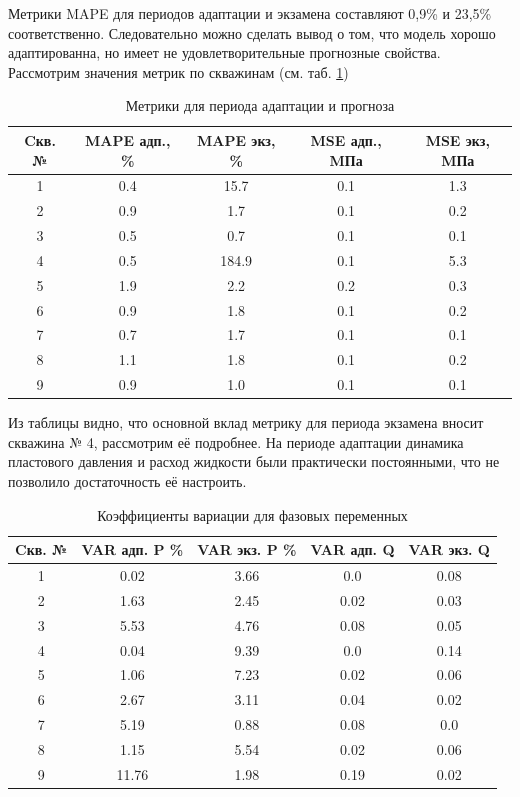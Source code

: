 \documentclass[14pt]{article}
\begin{document}
	 Метрики MAPE для периодов адаптации и экзамена составляют 0,9\% и 23,5\% соответственно. Следовательно можно сделать вывод о том, что модель хорошо адаптированна, но имеет не удовлетворительные прогнозные свойства. Рассмотрим значения метрик по скважинам (см. таб. \ref{tabl:well_mape}) 
	\begin{table}[h!]
		\caption{Метрики для периода адаптации и прогноза}	
		\label{tabl:well_mape}	
		\begin{center}
		\begin{tabular}{c|c|c|c|c}
		\hline
		Cкв. № & MAPE адп., \% & MAPE экз, \% & MSE адп., MПа & MSE экз, MПа \\
		\hline
 		1 & 0.4 & 15.7 & 0.1 & 1.3 \\
		2 & 0.9 & 1.7 & 0.1 & 0.2 \\
		3 & 0.5 & 0.7 & 0.1 & 0.1 \\
		4 & 0.5 & 184.9 & 0.1 & 5.3 \\
		5 & 1.9 & 2.2 & 0.2 & 0.3 \\
		6 & 0.9 & 1.8 & 0.1 & 0.2 \\
		7 & 0.7 & 1.7 & 0.1 & 0.1 \\
		8 & 1.1 & 1.8 & 0.1 & 0.2 \\
		9 & 0.9 & 1.0 & 0.1 & 0.1 \\
		\hline
	
		\end{tabular}
		\end{center}
	\end{table}
	
	Из таблицы видно, что основной вклад метрику для периода экзамена вносит скважина № 4, рассмотрим её подробнее. На периоде адаптации динамика пластового давления и расход жидкости были практически постоянными, что не позволило достаточность её настроить.
	
	\begin{table}[h!]
	\caption{Коэффициенты вариации для фазовых переменных}	
	\label{tabl:well_var}	
	\begin{center}
		\begin{tabular}{c|c|c|c|c}
		\hline
		Cкв. № & VAR адп. P \% & VAR экз. P \% & VAR адп. Q & VAR экз. Q \\
		\hline
		1 & 0.02 & 3.66 & 0.0 & 0.08 \\ 
		2 & 1.63 & 2.45 & 0.02 & 0.03 \\ 
		3 & 5.53 & 4.76 & 0.08 & 0.05 \\ 
		4 & 0.04 & 9.39 & 0.0 & 0.14 \\ 
		5 & 1.06 & 7.23 & 0.02 & 0.06 \\ 
		6 & 2.67 & 3.11 & 0.04 & 0.02 \\ 
		7 & 5.19 & 0.88 & 0.08 & 0.0 \\ 
		8 & 1.15 & 5.54 & 0.02 & 0.06 \\ 
		9 & 11.76 & 1.98 & 0.19 & 0.02 \\ 
		\hline
		\end{tabular}
	\end{center}
	\end{table}
\end{document}
